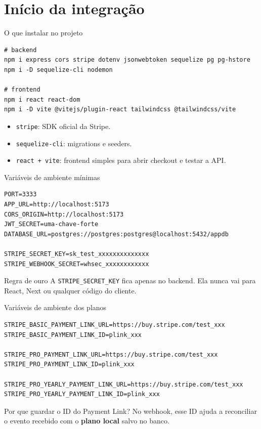 \documentclass[aspectratio=169]{beamer}
\newcommand{\code}[1]{\texttt{#1}}
\begin{document}
\section{Início da integração}

\begin{frame}[fragile]{O que instalar no projeto}
\begin{lstlisting}[language={}]
# backend
npm i express cors stripe dotenv jsonwebtoken sequelize pg pg-hstore
npm i -D sequelize-cli nodemon

# frontend
npm i react react-dom
npm i -D vite @vitejs/plugin-react tailwindcss @tailwindcss/vite
\end{lstlisting}

\begin{itemize}
  \item \code{stripe}: SDK oficial da Stripe.
  \item \code{sequelize-cli}: migrations e seeders.
  \item \code{react + vite}: frontend simples para abrir checkout e testar a API.
\end{itemize}
\end{frame}

\begin{frame}[fragile]{Variáveis de ambiente mínimas}
\begin{lstlisting}[language={}]
PORT=3333
APP_URL=http://localhost:5173
CORS_ORIGIN=http://localhost:5173
JWT_SECRET=uma-chave-forte
DATABASE_URL=postgres://postgres:postgres@localhost:5432/appdb

STRIPE_SECRET_KEY=sk_test_xxxxxxxxxxxxxx
STRIPE_WEBHOOK_SECRET=whsec_xxxxxxxxxxxx
\end{lstlisting}

\begin{alertblock}{Regra de ouro}
A \code{STRIPE\_SECRET\_KEY} fica apenas no backend. Ela nunca vai para React, Next ou qualquer código do cliente.
\end{alertblock}
\end{frame}

\begin{frame}[fragile]{Variáveis de ambiente dos planos}
\begin{lstlisting}[language={}]
STRIPE_BASIC_PAYMENT_LINK_URL=https://buy.stripe.com/test_xxx
STRIPE_BASIC_PAYMENT_LINK_ID=plink_xxx

STRIPE_PRO_PAYMENT_LINK_URL=https://buy.stripe.com/test_xxx
STRIPE_PRO_PAYMENT_LINK_ID=plink_xxx

STRIPE_PRO_YEARLY_PAYMENT_LINK_URL=https://buy.stripe.com/test_xxx
STRIPE_PRO_YEARLY_PAYMENT_LINK_ID=plink_xxx
\end{lstlisting}

\begin{exampleblock}{Por que guardar o ID do Payment Link?}
No webhook, esse ID ajuda a reconciliar o evento recebido com o \textbf{plano local} salvo no banco.
\end{exampleblock}
\end{frame}
\end{document}

